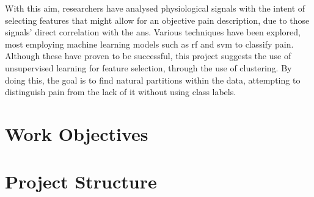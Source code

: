 With this aim, researchers have analysed physiological signals with the intent of selecting features that might allow for an objective pain description, due to those signals' direct correlation with the \ac{ans}. Various techniques have been explored, most employing machine learning models such as \ac{rf} and \ac{svm} to classify pain. Although these have proven to be successful, this project suggests the use of unsupervised learning for feature selection, through the use of clustering. By doing this, the goal is to find natural partitions within the data, attempting to distinguish pain from the lack of it without using class labels.


\section{Work Objectives}

\section{Project Structure}










